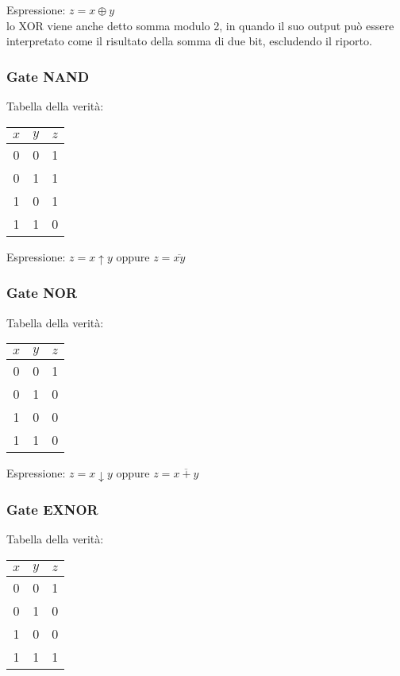 \documentclass{subfiles}
\begin{document}
\noindent
Espressione: $z = x \oplus y$ \\

\noindent
lo XOR viene anche detto somma modulo 2, in quando il suo output può essere interpretato come il risultato della somma di due bit, escludendo il riporto.

\subsubsection{Gate NAND}

Tabella della verità:

\begin{center}
\begin{tabular}{ |c|c|c| }
\hline
$x$ & $y$ & $z$ \\
\hline
\hline
0 & 0 & 1 \\
0 & 1 & 1 \\
1 & 0 & 1 \\
1 & 1 & 0 \\
\hline
\end{tabular}
\end{center}

\noindent
Espressione: $z = x \uparrow y$ oppure $z = \overline{xy}$

\subsubsection{Gate NOR}

Tabella della verità:

\begin{center}
\begin{tabular}{ |c|c|c| }
\hline
$x$ & $y$ & $z$ \\
\hline
\hline
0 & 0 & 1 \\
0 & 1 & 0 \\
1 & 0 & 0 \\
1 & 1 & 0 \\
\hline
\end{tabular}
\end{center}

\noindent
Espressione: $z = x \downarrow y$ oppure $z = \overline{x+y}$

\subsubsection{Gate EXNOR}

Tabella della verità:

\begin{center}
\begin{tabular}{ |c|c|c| }
\hline
$x$ & $y$ & $z$ \\
\hline
\hline
0 & 0 & 1 \\
0 & 1 & 0 \\
1 & 0 & 0 \\
1 & 1 & 1 \\
\hline
\end{tabular}
\end{center}
\end{document}
